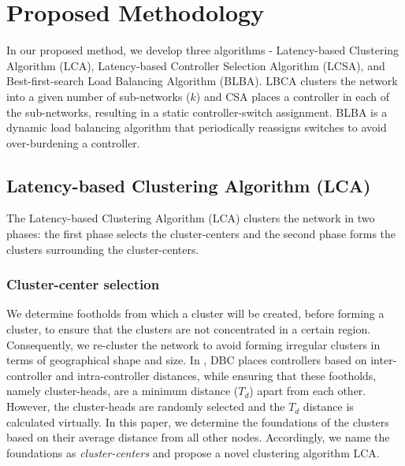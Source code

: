 \documentclass[final,5p,times]{cas-dc}
\begin{document}
	
	\section{Proposed Methodology} \label{proposal}
	
	In our proposed method, we develop three algorithms - Latency-based Clustering Algorithm (LCA), Latency-based Controller Selection Algorithm (LCSA), and Best-first-search Load Balancing Algorithm (BLBA). LBCA clusters the network into a given number of sub-networks ($k$) and CSA places a controller in each of the sub-networks, resulting in a static controller-switch assignment. BLBA is a dynamic load balancing algorithm that periodically reassigns switches to avoid over-burdening a controller.
	
	\subsection{Latency-based Clustering Algorithm (LCA)} \label{lbc}
	
	The Latency-based Clustering Algorithm (LCA) clusters the network in two phases: the first phase selects the cluster-centers and the second phase forms the clusters surrounding the cluster-centers.
	\subsubsection{Cluster-center selection}
	We determine footholds from which a cluster will be created, before forming a cluster, to ensure that the clusters are not concentrated in a certain region. Consequently, we re-cluster the network to avoid forming irregular clusters in terms of geographical shape and size. In \cite{aziz2019degree}, DBC places controllers based on inter-controller and intra-controller distances, while ensuring that these footholds, namely cluster-heads, are a minimum distance ($T_d$) apart from each other. However, the cluster-heads are randomly selected and the $T_d$ distance is calculated virtually. In this paper, we determine the foundations of the clusters based on their average distance from all other nodes. Accordingly, we name the foundations as \textit{cluster-centers} and propose a novel clustering algorithm LCA.
	
\end{document}
